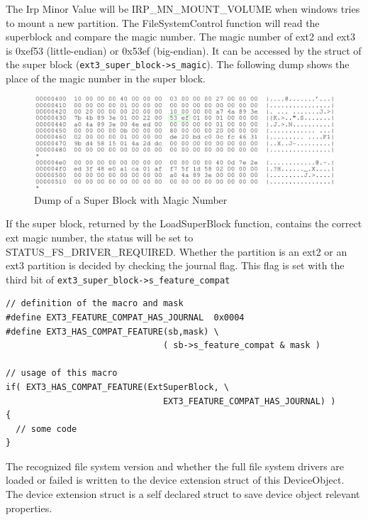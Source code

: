 The Irp Minor Value will be IRP\_\-MN\_\-MOUNT\_\-VOLUME when windows tries to mount a new partition. The FileSystemControl function will read the superblock and compare the magic number. The magic number of ext2 and ext3 is 0xef53 (little-endian) or 0x53ef (big-endian). It can be accessed by the struct of the super block (\verb~ext3_super_block->s_magic~). The following dump shows the place of the magic number in the super block.

\begin{figure}[H]
\begin{center}
\includegraphics[width=\linewidth]{./files/inc/pic/techRep_FsRec_MagicNumber}
\end{center}
\caption{\label{fig:techRep_FsRec_MagicNumber}Dump of a Super Block with Magic Number}
\end{figure}

\noindent
If the super block, returned by the LoadSuperBlock function, contains the correct ext magic number, the status will be set to STATUS\_\-FS\_\-DRIVER\_\-REQUIRED. Whether the partition is an ext2 or an ext3 partition is decided by checking the journal flag. This flag is set with the third bit of \verb~ext3_super_block->s_feature_compat~

\begin{Verbatim}
// definition of the macro and mask
#define EXT3_FEATURE_COMPAT_HAS_JOURNAL  0x0004
#define EXT3_HAS_COMPAT_FEATURE(sb,mask) \
                               ( sb->s_feature_compat & mask )
                               
// usage of this macro                               
if( EXT3_HAS_COMPAT_FEATURE(ExtSuperBlock, \
                               EXT3_FEATURE_COMPAT_HAS_JOURNAL) )
{
  // some code
}
\end{Verbatim}

The recognized file system version and whether the full file system drivers are loaded or failed is written to the device extension struct of this DeviceObject. The device extension struct is a self declared struct to save device object relevant properties.

